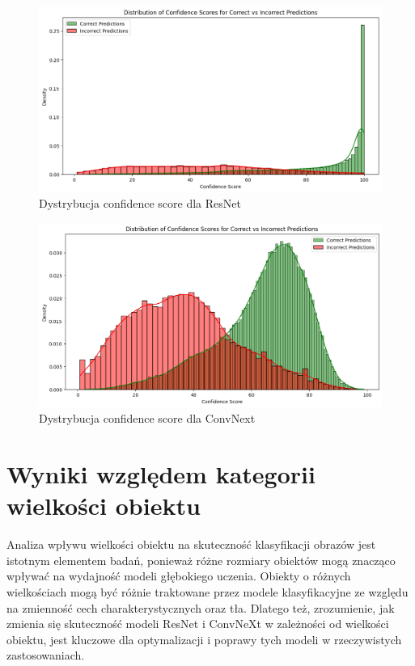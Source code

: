 \begin{figure}
	\centering\includegraphics[width=.9\textwidth]{img/resnet_conf_distro}
	\caption{Dystrybucja confidence score dla ResNet}
	\label{rys:res_c_distro}
\end{figure}

\begin{figure}
	\centering\includegraphics[width=.9\textwidth]{img/convnext_conf_distro}
	\caption{Dystrybucja confidence score dla ConvNext}
	\label{rys:conv_c_distro}
\end{figure}
\newpage

\section*{Wyniki względem kategorii wielkości obiektu}
Analiza wpływu wielkości obiektu na skuteczność klasyfikacji obrazów jest istotnym elementem badań, ponieważ różne rozmiary obiektów mogą 
znacząco wpływać na wydajność modeli głębokiego uczenia. Obiekty o różnych wielkościach mogą być różnie traktowane przez modele klasyfikacyjne 
ze względu na zmienność cech charakterystycznych oraz tła. Dlatego też, zrozumienie, jak zmienia się skuteczność modeli ResNet i ConvNeXt w 
zależności od wielkości obiektu, jest kluczowe dla optymalizacji i poprawy tych modeli w rzeczywistych zastosowaniach.




